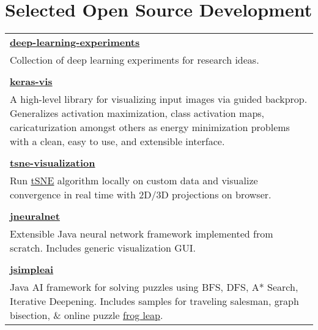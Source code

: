 \documentclass[a4paper,11pt]{article}
\begin{document}
\section{Selected Open Source Development}
\begin{longtable}[l]{l}
\textbf{\href{https://github.com/raghakot/deep-learning-experiments}{deep-learning-experiments}} \\
\footnotesize{ \begin{minipage}[t]{12.5cm} Collection of deep learning experiments for research ideas.
\end{minipage}}
\\
 \multicolumn{1}{l}{}
\\
\textbf{\href{https://github.com/raghakot/keras-vis}{keras-vis}} \\
\footnotesize{ \begin{minipage}[t]{12.5cm} A high-level library for visualizing input images via guided backprop. Generalizes activation maximization, class activation maps, caricaturization amongst others as energy minimization problems with a clean, easy to use, and extensible interface.
\end{minipage}}
\\
 \multicolumn{1}{l}{}
\\
\textbf{\href{https://github.com/raghakot/tsne-visualization}{tsne-visualization}} \\
\footnotesize{ \begin{minipage}[t]{12.5cm} Run \href{https://lvdmaaten.github.io/tsne/}{tSNE} algorithm locally on custom data and visualize convergence in real time with 2D/3D projections on browser.
\end{minipage}}
\\
 \multicolumn{1}{l}{}
\\
\textbf{\href{https://github.com/raghakot/jneuralnet}{jneuralnet}} \\
\footnotesize{ \begin{minipage}[t]{12.5cm} Extensible Java neural network framework implemented from scratch. Includes generic visualization GUI.
\end{minipage}}
\\
 \multicolumn{1}{l}{}
\\
\textbf{\href{https://github.com/raghakot/jsimpleai}{jsimpleai}} \\
\footnotesize{ \begin{minipage}[t]{12.5cm} Java AI framework for solving puzzles using BFS, DFS, A* Search, Iterative Deepening. Includes samples for traveling salesman, graph bisection, \& online puzzle \href{http://www.justriddlesandmore.com/frogleap.html}{frog leap}.
\end{minipage}} \\
\end{longtable}
\end{document}
